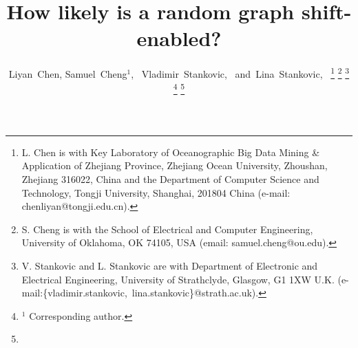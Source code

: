 \documentclass[journal]{IEEEtran}
\begin{document}
%
\title{How likely is a random graph shift-enabled?}
%
%
%

\author{Liyan~Chen,
Samuel~Cheng$^1$,~
                Vladimir~Stankovic,~
        and~Lina~Stankovic,~
\thanks{L. Chen is with 
Key Laboratory of Oceanographic Big Data Mining \& Application of Zhejiang Province, Zhejiang Ocean University, Zhoushan, Zhejiang 316022, China
and the Department
of Computer Science and Technology, Tongji University, Shanghai,
 201804 China  (e-mail: chenliyan@tongji.edu.cn).}%
\thanks{S. Cheng is with
the School of Electrical and Computer Engineering, University of Oklahoma, OK 74105, USA (email: samuel.cheng@ou.edu).}
\thanks{V. Stankovic and L. Stankovic are with Department of Electronic and Electrical Engineering,
         University of Strathclyde, Glasgow, G1 1XW U.K.
        (e-mail:\{vladimir.stankovic,~lina.stankovic\}@strath.ac.uk).}%
\thanks{$^1$ Corresponding author.}
\thanks{%
}
}
\end{document}
